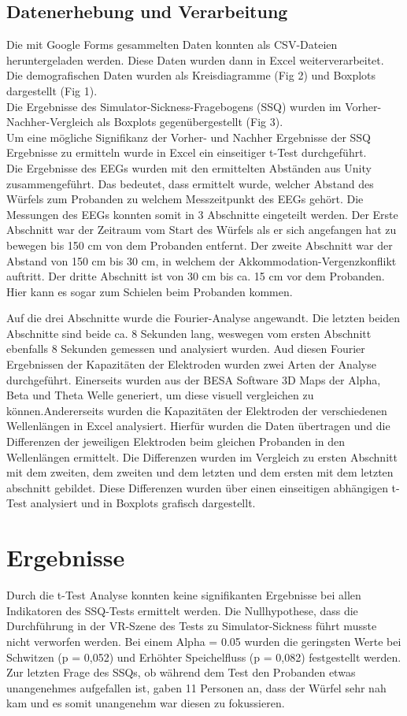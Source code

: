 \documentclass[conference]{IEEEtran}
\begin{document}
\subsection{Datenerhebung und Verarbeitung}
Die mit Google Forms gesammelten Daten konnten als CSV-Dateien heruntergeladen werden. Diese Daten wurden dann in Excel weiterverarbeitet. Die demografischen Daten wurden als Kreisdiagramme (Fig 2) und Boxplots dargestellt (Fig 1).\\
Die Ergebnisse des Simulator-Sickness-Fragebogens (SSQ) wurden im Vorher-Nachher-Vergleich als Boxplots gegenübergestellt (Fig 3).\\
Um eine mögliche Signifikanz der Vorher- und Nachher Ergebnisse der SSQ Ergebnisse zu ermitteln wurde in Excel ein einseitiger t-Test durchgeführt.\\ 
Die Ergebnisse des EEGs wurden mit den ermittelten Abständen aus Unity zusammengeführt. Das bedeutet, dass ermittelt wurde, welcher Abstand des Würfels zum Probanden zu welchem Messzeitpunkt des EEGs gehört. Die Messungen des EEGs konnten somit in 3 Abschnitte eingeteilt werden. Der Erste Abschnitt war der Zeitraum vom Start des Würfels als er sich angefangen hat zu bewegen bis 150 cm von dem Probanden entfernt. Der zweite Abschnitt war der Abstand von 150 cm bis 30 cm, in welchem der Akkommodation-Vergenzkonflikt auftritt. Der dritte Abschnitt ist von 30 cm bis ca. 15 cm vor dem Probanden. Hier kann es sogar zum Schielen beim Probanden kommen.

Auf die drei Abschnitte wurde die Fourier-Analyse angewandt. Die letzten beiden Abschnitte sind beide ca. 8 Sekunden lang, weswegen vom ersten Abschnitt ebenfalls 8 Sekunden gemessen und analysiert wurden.
Aud diesen Fourier Ergebnissen der Kapazitäten der Elektroden wurden zwei Arten der Analyse durchgeführt. Einerseits wurden aus der BESA Software 3D Maps der Alpha, Beta und Theta Welle generiert, um diese visuell vergleichen zu können.Andererseits wurden die Kapazitäten der Elektroden der verschiedenen Wellenlängen in Excel analysiert. Hierfür wurden die Daten übertragen und die Differenzen der jeweiligen Elektroden beim gleichen Probanden in den Wellenlängen ermittelt. Die Differenzen wurden im Vergleich zu ersten Abschnitt mit dem zweiten, dem zweiten und dem letzten und dem ersten mit dem letzten abschnitt gebildet. Diese Differenzen wurden über einen einseitigen abhängigen t-Test analysiert und in Boxplots grafisch dargestellt.


\section{Ergebnisse}
Durch die t-Test Analyse konnten keine signifikanten Ergebnisse bei allen Indikatoren des SSQ-Tests ermittelt werden. Die Nullhypothese, dass die Durchführung in der VR-Szene des Tests zu Simulator-Sickness führt musste nicht verworfen werden. Bei einem Alpha = 0.05 wurden die geringsten Werte bei Schwitzen (p = 0,052) und Erhöhter Speichelfluss (p = 0,082) festgestellt werden. Zur letzten Frage des SSQs, ob während dem Test den Probanden etwas unangenehmes aufgefallen ist, gaben 11 Personen an, dass der Würfel sehr nah kam und es somit unangenehm war diesen zu fokussieren.\\
\end{document}
